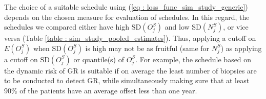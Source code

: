 The choice of a suitable schedule using (\ref{eq : loss_func_sim_study_generic}) depends on the chosen measure for evaluation of schedules. In this regard, the schedules we compared either have high $\mbox{SD}(O^S_j)$ and low $\mbox{SD}(N^S_j)$, or vice versa (Table \ref{table : sim_study_pooled_estimates}). Thus, applying a cutoff on $E(O^S_j)$ when $\mbox{SD}(O^S_j)$ is high may not be as fruitful (same for $N^S_j$) as applying a cutoff on $\mbox{SD}(O^S_j)$ or quantile(s) of $O^S_j$. For example, the schedule based on the dynamic risk of GR is suitable if on average the least number of biopsies are to be conducted to detect GR, while simultaneously making sure that at least 90\% of the patients have an average offset less than one year.
